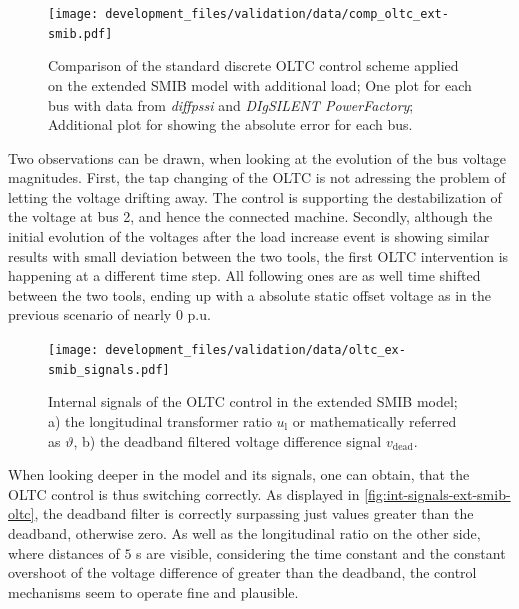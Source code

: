 \begin{figure}[htbp!]
    \centering
    \texttt{[image: development\_files/validation/data/comp\_oltc\_ext-smib.pdf]}
    \caption[Bus and Error Comparison for the standard discrete \acs{OLTC} scheme applied on the extended \acs{SMIB} model with load]{Comparison of the standard discrete \acs{OLTC} control scheme applied on the extended \acs{SMIB} model with additional load; One plot for each bus with data from \textit{diffpssi} and \textit{DIgSILENT PowerFactory}; Additional plot for showing the absolute error for each bus.}
    \label{fig:comp-oltc-control-ex-smib}
\end{figure}

Two observations can be drawn, when looking at the evolution of the bus voltage magnitudes.
First, the tap changing of the \acs{OLTC} is not adressing the problem of letting the voltage drifting away.
The control is supporting the destabilization of the voltage at bus 2, and hence the connected machine.
Secondly, although the initial evolution of the voltages after the load increase event is showing similar results with small deviation between the two tools, the first \acs{OLTC} intervention is happening at a different time step.
All following ones are as well time shifted between the two tools, ending up with a absolute static offset voltage as in the previous scenario of nearly $0$ p.u.

\begin{figure}[htbp!]
    \centering
    \texttt{[image: development\_files/validation/data/oltc\_ex-smib\_signals.pdf]}
    \caption[Internal signals of the \acs{OLTC} control in the extended \acs{SMIB} model]{Internal signals of the \acs{OLTC} control in the extended \acs{SMIB} model; a) the longitudinal transformer ratio $u_\mathrm{l}$ or mathematically referred as $\vartheta$, b) the deadband filtered voltage difference signal $v_\mathrm{dead}$.}
    \label{fig:int-signals-ext-smib-oltc}
\end{figure}

When looking deeper in the model and its signals, one can obtain, that the \acs{OLTC} control is thus switching correctly.
As displayed in \autoref{fig:int-signals-ext-smib-oltc}, the deadband filter is correctly surpassing just values greater than the deadband, otherwise zero.
As well as the longitudinal ratio on the other side, where distances of $5$ s are visible, considering the time constant and the constant overshoot of the voltage difference of greater than the deadband, the control mechanisms seem to operate fine and plausible.

